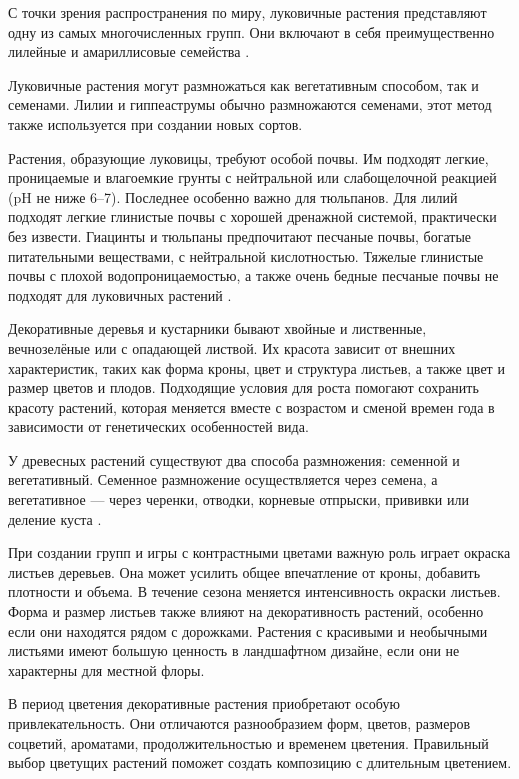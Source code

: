 С точки зрения распространения по миру, луковичные растения представляют одну из самых многочисленных групп. Они включают в себя преимущественно лилейные и амариллисовые семейства \cite{belyaevskaya}.

Луковичные растения могут размножаться как вегетативным способом, так и семенами. Лилии и гиппеаструмы обычно размножаются семенами, этот метод также используется при создании новых сортов.

Растения, образующие луковицы, требуют особой почвы. Им подходят легкие, проницаемые и влагоемкие грунты с нейтральной или слабощелочной реакцией (pH не ниже 6–7). Последнее особенно важно для тюльпанов. Для лилий подходят легкие глинистые почвы с хорошей дренажной системой, практически без извести. Гиацинты и тюльпаны предпочитают песчаные почвы, богатые питательными веществами, с нейтральной кислотностью. Тяжелые глинистые почвы с плохой водопроницаемостью, а также очень бедные песчаные почвы не подходят для луковичных растений \cite{doroshenko}.

Декоративные деревья и кустарники бывают хвойные и лиственные, вечнозелёные или с опадающей листвой. Их красота зависит от внешних характеристик, таких как форма кроны, цвет и структура листьев, а также цвет и размер цветов и плодов. Подходящие условия для роста помогают сохранить красоту растений, которая меняется вместе с возрастом и сменой времен года в зависимости от генетических особенностей вида.

У древесных растений существуют два способа размножения: семенной и вегетативный. Семенное размножение осуществляется через семена, а вегетативное — через черенки, отводки, корневые отпрыски, прививки или деление куста \cite{berd}.

При создании групп и игры с контрастными цветами важную роль играет окраска листьев деревьев. Она может усилить общее впечатление от кроны, добавить плотности и объема. В течение сезона меняется интенсивность окраски листьев. Форма и размер листьев также влияют на декоративность растений, особенно если они находятся рядом с дорожками. Растения с красивыми и необычными листьями имеют большую ценность в ландшафтном дизайне, если они не характерны для местной флоры.

В период цветения декоративные растения приобретают особую привлекательность. Они отличаются разнообразием форм, цветов, размеров соцветий, ароматами, продолжительностью и временем цветения. Правильный выбор цветущих растений поможет создать композицию с длительным цветением.

